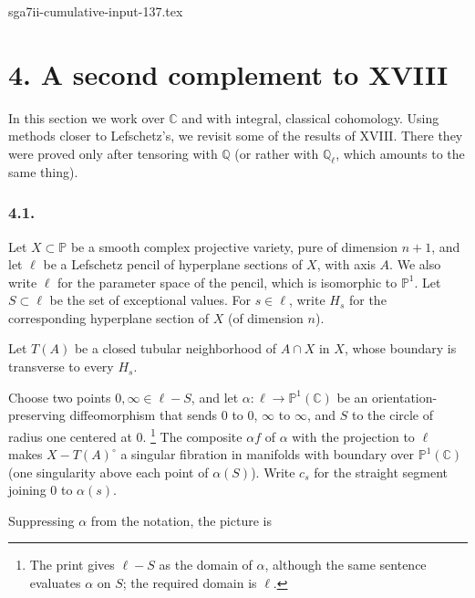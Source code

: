\begin{filecontents*}{sga7ii-cumulative-input-137.tex}
\section*{4. A second complement to XVIII}

In this section we work over $\mathbb C$ and with integral, classical
cohomology.  Using methods closer to Lefschetz's, we revisit some of the
results of XVIII.  There they were proved only after tensoring with
$\mathbb Q$ (or rather with $\mathbb Q_\ell$, which amounts to the same
thing).

\subsubsection*{4.1.}
Let $X\subset\mathbb P$ be a smooth complex projective variety, pure of
dimension $n+1$, and let $\ell$ be a Lefschetz pencil of hyperplane
sections of $X$, with axis $A$.  We also write $\ell$ for the parameter
space of the pencil, which is isomorphic to $\mathbb P^1$.  Let
$S\subset\ell$ be the set of exceptional values.  For $s\in\ell$, write
$H_s$ for the corresponding hyperplane section of $X$ (of dimension $n$).

Let $T(A)$ be a closed tubular neighborhood of $A\cap X$ in $X$, whose
boundary is transverse to every $H_s$.

Choose two points $0,\infty\in\ell-S$, and let
$\alpha:\ell\to\mathbb P^1(\mathbb C)$ be an orientation-preserving
diffeomorphism that sends $0$ to $0$, $\infty$ to $\infty$, and $S$ to the
circle of radius one centered at $0$.
\footnote{The print gives $\ell-S$ as the domain of $\alpha$, although the
same sentence evaluates $\alpha$ on $S$; the required domain is $\ell$.}
The composite $\alpha f$ of $\alpha$ with the projection to $\ell$ makes
$X-T(A)^\circ$ a singular fibration in manifolds with boundary over
$\mathbb P^1(\mathbb C)$ (one singularity above each point of
$\alpha(S)$).  Write $c_s$ for the straight segment joining $0$ to
$\alpha(s)$.

Suppressing $\alpha$ from the notation, the picture is
\begin{center}
\end{center}


\end{filecontents*}
